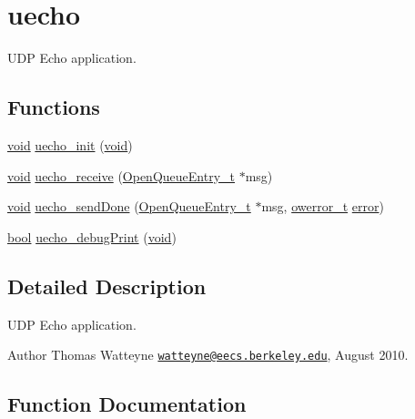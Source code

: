 \hypertarget{group__uecho}{}\section{uecho}
\label{group__uecho}


U\+DP Echo application.  


\subsection*{Functions}
\begin{DoxyCompactItemize}
\item 
\hyperlink{usb__devapi_8h_afabf60e7f57651d6d595a02c75f07cd0}{void} \hyperlink{group__uecho_ga048fe583e765cf2ca6854b509eb47857}{uecho\+\_\+init} (\hyperlink{usb__devapi_8h_afabf60e7f57651d6d595a02c75f07cd0}{void})
\item 
\hyperlink{usb__devapi_8h_afabf60e7f57651d6d595a02c75f07cd0}{void} \hyperlink{group__uecho_ga681a3d2039e01831097ed1245ac4d93b}{uecho\+\_\+receive} (\hyperlink{struct_open_queue_entry__t}{Open\+Queue\+Entry\+\_\+t} $\ast$msg)
\item 
\hyperlink{usb__devapi_8h_afabf60e7f57651d6d595a02c75f07cd0}{void} \hyperlink{group__uecho_ga046a0a11a26352ba95623b77726445c4}{uecho\+\_\+send\+Done} (\hyperlink{struct_open_queue_entry__t}{Open\+Queue\+Entry\+\_\+t} $\ast$msg, \hyperlink{opendefs_8h_af20b7c3ed9d2ba19e56a309ad9314803}{owerror\+\_\+t} \hyperlink{disk_8c_ad018a3100b2dabad325a0800152db297}{error})
\item 
\hyperlink{_p_e___types_8h_a97a80ca1602ebf2303258971a2c938e2}{bool} \hyperlink{group__uecho_ga06677faea7a7af9a0e3cbf6ec0d1707f}{uecho\+\_\+debug\+Print} (\hyperlink{usb__devapi_8h_afabf60e7f57651d6d595a02c75f07cd0}{void})
\end{DoxyCompactItemize}


\subsection{Detailed Description}
U\+DP Echo application. 

\begin{DoxyAuthor}{Author}
Thomas Watteyne \href{mailto:watteyne@eecs.berkeley.edu}{\tt watteyne@eecs.\+berkeley.\+edu}, August 2010. 
\end{DoxyAuthor}


\subsection{Function Documentation}
